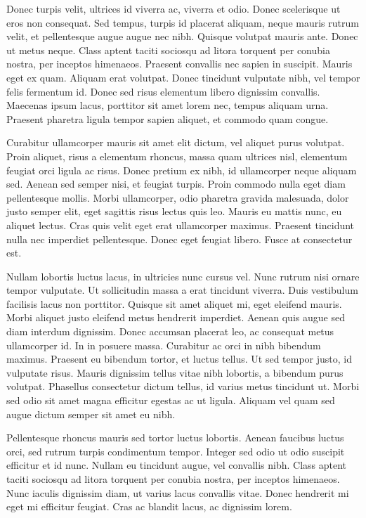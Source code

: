 Donec turpis velit, ultrices id viverra ac, viverra et odio. Donec scelerisque ut eros non consequat. Sed tempus, turpis id placerat aliquam, neque mauris rutrum velit, et pellentesque augue augue nec nibh. Quisque volutpat mauris ante. Donec ut metus neque. Class aptent taciti sociosqu ad litora torquent per conubia nostra, per inceptos himenaeos. Praesent convallis nec sapien in suscipit. Mauris eget ex quam. Aliquam erat volutpat. Donec tincidunt vulputate nibh, vel tempor felis fermentum id. Donec sed risus elementum libero dignissim convallis. Maecenas ipsum lacus, porttitor sit amet lorem nec, tempus aliquam urna. Praesent pharetra ligula tempor sapien aliquet, et commodo quam congue.

Curabitur ullamcorper mauris sit amet elit dictum, vel aliquet purus volutpat. Proin aliquet, risus a elementum rhoncus, massa quam ultrices nisl, elementum feugiat orci ligula ac risus. Donec pretium ex nibh, id ullamcorper neque aliquam sed. Aenean sed semper nisi, et feugiat turpis. Proin commodo nulla eget diam pellentesque mollis. Morbi ullamcorper, odio pharetra gravida malesuada, dolor justo semper elit, eget sagittis risus lectus quis leo. Mauris eu mattis nunc, eu aliquet lectus. Cras quis velit eget erat ullamcorper maximus. Praesent tincidunt nulla nec imperdiet pellentesque. Donec eget feugiat libero. Fusce at consectetur est.

Nullam lobortis luctus lacus, in ultricies nunc cursus vel. Nunc rutrum nisi ornare tempor vulputate. Ut sollicitudin massa a erat tincidunt viverra. Duis vestibulum facilisis lacus non porttitor. Quisque sit amet aliquet mi, eget eleifend mauris. Morbi aliquet justo eleifend metus hendrerit imperdiet. Aenean quis augue sed diam interdum dignissim. Donec accumsan placerat leo, ac consequat metus ullamcorper id. In in posuere massa. Curabitur ac orci in nibh bibendum maximus. Praesent eu bibendum tortor, et luctus tellus. Ut sed tempor justo, id vulputate risus. Mauris dignissim tellus vitae nibh lobortis, a bibendum purus volutpat. Phasellus consectetur dictum tellus, id varius metus tincidunt ut. Morbi sed odio sit amet magna efficitur egestas ac ut ligula. Aliquam vel quam sed augue dictum semper sit amet eu nibh.

Pellentesque rhoncus mauris sed tortor luctus lobortis. Aenean faucibus luctus orci, sed rutrum turpis condimentum tempor. Integer sed odio ut odio suscipit efficitur et id nunc. Nullam eu tincidunt augue, vel convallis nibh. Class aptent taciti sociosqu ad litora torquent per conubia nostra, per inceptos himenaeos. Nunc iaculis dignissim diam, ut varius lacus convallis vitae. Donec hendrerit mi eget mi efficitur feugiat. Cras ac blandit lacus, ac dignissim lorem.

